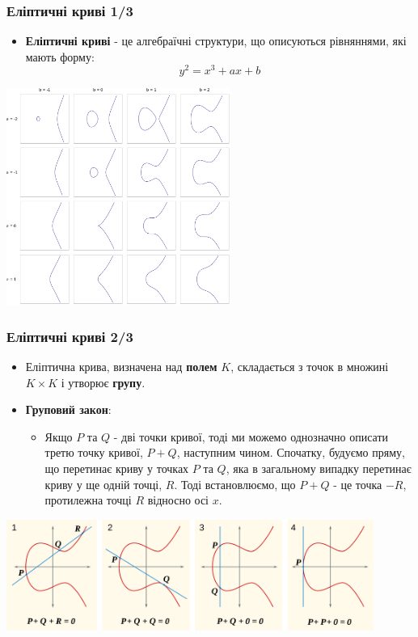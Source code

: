\documentclass{beamer}
\begin{document}
\begin{frame}
  \frametitle{Еліптичні криві 1/3}
  \begin{itemize}
  \item \textbf{Еліптичні криві} - це алгебраїчні структури, що описуються
    рівняннями, які мають форму:
    $$y^2 = x^3 + ax + b$$
  \end{itemize}
  \begin{center}
    \includegraphics[width=0.55\textwidth]{ec}
  \end{center}
\end{frame}

\begin{frame}
  \frametitle{Еліптичні криві 2/3}
  \begin{itemize}
  \item Еліптична крива, визначена над \textbf{полем} $K$, складається з точок в
    множині $K \times K$ і утворює \textbf{групу}.
  \item \textbf{Груповий закон}:
    \begin{itemize}
    \item Якщо $P$ та $Q$ - дві точки кривої, тоді ми можемо однозначно описати
      третю точку кривої, $P + Q$, наступним чином. Спочатку, будуємо пряму, що
      перетинає криву у точках $P$ та $Q$, яка в загальному випадку перетинає
      криву у ще одній точці, $R$. Тоді встановлюємо, що $P + Q$ - це точка
      $-R$, протилежна точці $R$ відносно осі $x$.
    \end{itemize}
  \end{itemize}
  \begin{center}
    \includegraphics[width=0.9\textwidth]{ec_group}
  \end{center}
\end{frame}
\end{document}

